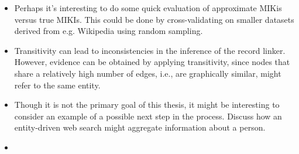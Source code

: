 \documentclass{article}
\begin{document}
\begin{itemize}
    \item Perhaps it's interesting to do some quick evaluation of approximate MIKis versus true MIKIs. This could be done by cross-validating on smaller datasets derived from e.g. Wikipedia using random sampling.
    \item Transitivity can lead to inconsistencies in the inference of the record linker. However, evidence can be obtained by applying transitivity, since nodes that share a relatively high number of edges, i.e., are graphically similar, might refer to the same entity.
    \item Though it is not the primary goal of this thesis, it might be interesting to consider an example of a possible next step in the process. Discuss how an entity-driven web search might aggregate information about a person.
    \item 
\end{itemize}



\end{document}
